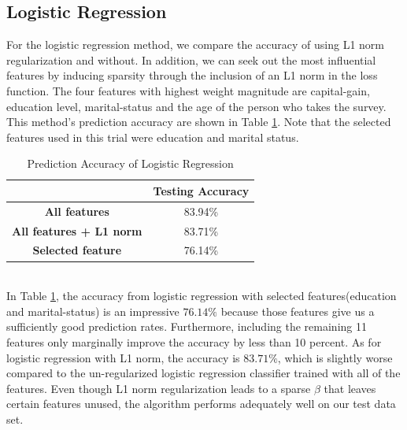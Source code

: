 \documentclass[conference]{IEEEtran}
\begin{document}
\subsection{Logistic Regression}
For the logistic regression method, we compare the accuracy of using L1 norm regularization and without. In addition, we can seek out the most influential features by inducing sparsity through the inclusion of an L1 norm in the loss function. The four features with highest weight magnitude are capital-gain, education level, marital-status and the age of the person who takes the survey.\\
This method's prediction accuracy are shown in Table \ref{table:log}. Note that the selected features used in this trial were education and marital status. 
\begin{table}[h]
\centering
\begin{tabular}{|c|c|}
\hline
                              & \textbf{Testing Accuracy} \\ \hline
\textbf{All features}          & 83.94\%                      \\ \hline
\textbf{All features + L1 norm} & 83.71\%                      \\ \hline
\textbf{Selected feature}     & 76.14\%                      \\ \hline
\end{tabular}
\caption{Prediction Accuracy of Logistic Regression}
\label{table:log}
\end{table}\\
In Table \ref{table:log}, the accuracy from logistic regression with selected features(education and marital-status) is an impressive $76.14\%$ because those features give us a sufficiently good prediction rates. Furthermore, including the remaining 11 features only marginally improve the accuracy by less than 10 percent. As for logistic regression with L1 norm, the accuracy is $83.71 \%$, which is slightly worse compared to the un-regularized logistic regression classifier trained with all of the features. Even though L1 norm regularization leads to a sparse $\beta$ that leaves certain features unused, the algorithm performs adequately well on our test data set.\\ 
\end{document}
